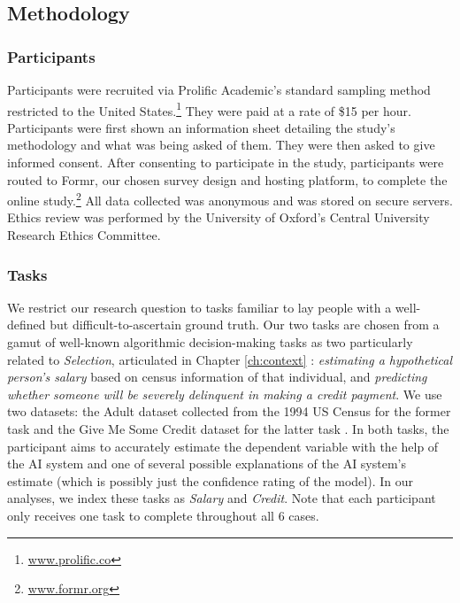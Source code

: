 \subsection{Methodology}
\subsubsection{Participants}
Participants were recruited via Prolific Academic's standard sampling method restricted to the United States.\footnote{\url{www.prolific.co}} They were paid at a rate of \$15 per hour. Participants were first shown an information sheet detailing the study's methodology and what was being asked of them. They were then asked to give informed consent. After consenting to participate in the study, participants were routed to Formr, our chosen survey design and hosting platform, to complete the online study.\footnote{\url{www.formr.org}} All data collected was anonymous and was stored on secure servers. Ethics review was performed by the University of Oxford's Central University Research Ethics Committee.

\subsubsection{Tasks}
We restrict our research question to tasks familiar to lay people with a well-defined but difficult-to-ascertain ground truth. Our two tasks are chosen from a gamut of well-known algorithmic decision-making tasks as two particularly related to \emph{Selection}, articulated in Chapter \ref{ch:context} \cite{10.1111/j.1467-954X.2007.00740.x,Pasquale_2006,Latzer_Hollnbuchner_Just_Saurwein_2014}: \emph{estimating a hypothetical person's salary} based on census information of that individual, and \emph{predicting whether someone will be severely delinquent in making a credit payment}. We use two datasets: the Adult dataset collected from the 1994 US Census for the former task and the Give Me Some Credit dataset for the latter task \cite{kohavi_scaling_1996, GiveMeSomeCredit}. In both tasks, the participant aims to accurately estimate the dependent variable with the help of the AI system and one of several possible explanations of the AI system's estimate (which is possibly just the confidence rating of the model). In our analyses, we index these tasks as \emph{Salary} and \emph{Credit}. Note that each participant only receives one task to complete throughout all 6 cases. 

